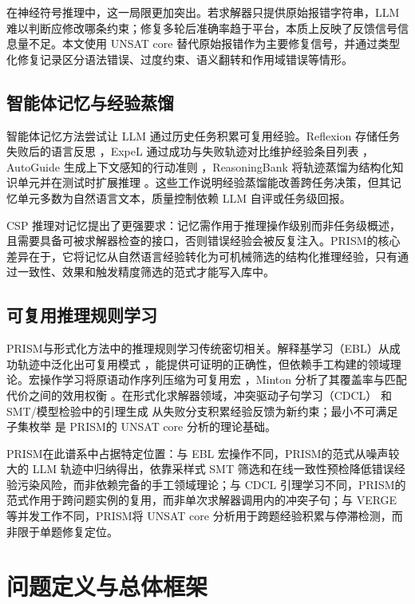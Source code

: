 \documentclass[UTF8,a4paper,12pt]{ctexart}
\newcommand{\PRISM}{PRISM}
\begin{document}
在神经符号推理中，这一局限更加突出。若求解器只提供原始报错字符串，LLM 难以判断应修改哪条约束；修复多轮后准确率趋于平台，本质上反映了反馈信号信息量不足。本文使用 UNSAT core 替代原始报错作为主要修复信号，并通过类型化修复记录区分语法错误、过度约束、语义翻转和作用域错误等情形。

\subsection{智能体记忆与经验蒸馏}

智能体记忆方法尝试让 LLM 通过历史任务积累可复用经验。Reflexion 存储任务失败后的语言反思 \cite{shinn2023}，ExpeL 通过成功与失败轨迹对比维护经验条目列表 \cite{zhao2024}，AutoGuide 生成上下文感知的行动准则 \cite{fu2024}，ReasoningBank 将轨迹蒸馏为结构化知识单元并在测试时扩展推理 \cite{ouyang2025}。这些工作说明经验蒸馏能改善跨任务决策，但其记忆单元多数为自然语言文本，质量控制依赖 LLM 自评或任务级回报。

CSP 推理对记忆提出了更强要求：记忆需作用于推理操作级别而非任务级概述，且需要具备可被求解器检查的接口，否则错误经验会被反复注入。\PRISM 的核心差异在于，它将记忆从自然语言经验转化为可机械筛选的结构化推理经验，只有通过一致性、效果和触发精度筛选的范式才能写入库中。

\subsection{可复用推理规则学习}

\PRISM 与形式化方法中的推理规则学习传统密切相关。解释基学习（EBL）从成功轨迹中泛化出可复用模式 \cite{mitchell1986,dejong1986}，能提供可证明的正确性，但依赖手工构建的领域理论。宏操作学习将原语动作序列压缩为可复用宏 \cite{korf1985}，Minton 分析了其覆盖率与匹配代价之间的效用权衡 \cite{minton1990}。在形式化求解器领域，冲突驱动子句学习（CDCL）\cite{marquessilva1996} 和 SMT/模型检验中的引理生成 \cite{bradley2011} 从失败分支积累经验反馈为新约束；最小不可满足子集枚举 \cite{liffiton2008} 是 \PRISM 的 UNSAT core 分析的理论基础。

\PRISM 在此谱系中占据特定位置：与 EBL 宏操作不同，\PRISM 的范式从噪声较大的 LLM 轨迹中归纳得出，依靠采样式 SMT 筛选和在线一致性预检降低错误经验污染风险，而非依赖完备的手工领域理论；与 CDCL 引理学习不同，\PRISM 的范式作用于跨问题实例的复用，而非单次求解器调用内的冲突子句；与 VERGE 等并发工作不同，\PRISM 将 UNSAT core 分析用于跨题经验积累与停滞检测，而非限于单题修复定位。

\section{问题定义与总体框架}
\end{document}
